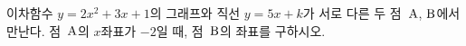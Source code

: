 이차함수 $y=2x^2+3x+1$의 그래프와 직선 $y=5x+k$가 서로 다른 두 점~$\mathrm{A}$, $\mathrm{B}$에서 만난다. 점~$\mathrm{A}$의 $x$좌표가 $-2$일 때, 점~$\mathrm{B}$의 좌표를 구하시오. 
